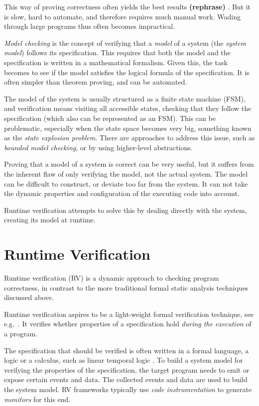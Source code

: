 \documentclass[a4paper,11pt]{kth-mag}
\newcommand{\rephrase}{\textbf{(rephrase)} }
\begin{document}
This way of proving correctness often yields the best results \rephrase. But it
is slow, hard to automate, and therefore requires much manual work. Wading
through large programs thus often becomes impractical.

\textit{Model checking} is the concept of verifying that a \textit{model} of a
system (the \textit{system model}) follows its specification. This requires
that both the model and the specification is written in a mathematical
formalism. Given this, the task becomes to see if the model satisfies the
logical formula of the specification. It is often simpler than theorem proving,
and can be automated.

The model of the system is usually structured as a finite state machine (FSM),
and verification means visiting all accessible states, checking that they
follow the specification (which also can be represented as an FSM). This can be
problematic, especially when the state space becomes very big, something known
as the \textit{state explosion problem}. There are approaches to address this
issue, such as \textit{bounded model checking}, or by using higher-level
abstractions.

Proving that a model of a system is correct can be very useful, but it suffers
from the inherent flaw of only verifying the model, not the actual system. The
model can be difficult to construct, or deviate too far from the system. It can
not take the dynamic properties and configuration of the executing code into
account.

Runtime verification attempts to solve this by dealing directly with the
system, creating its model at runtime.


\section{Runtime Verification} \label{section-rv}

Runtime verification (RV) is a dynamic approach to checking program
correctness, in contrast to the more traditional formal static analysis
techniques discussed above.

Runtime verification aspires to be a light-weight formal verification
technique, see e.g.\ \cite{leucker09abriefaccount,delgado04taxonomy}. It
verifies whether properties of a specification hold \textit{during the
execution} of a program.

The specification that should be verified is often written in a formal
language, a logic or a calculus, such as linear temporal logic \cite{pnueli77}.
To build a system model for verifying the properties of the specification, the
target program needs to emit or expose certain events and data. The collected
events and data are used to build the system model. RV frameworks typically
use \textit{code instrumentation} to generate \textit{monitors} for this end.
\end{document}
